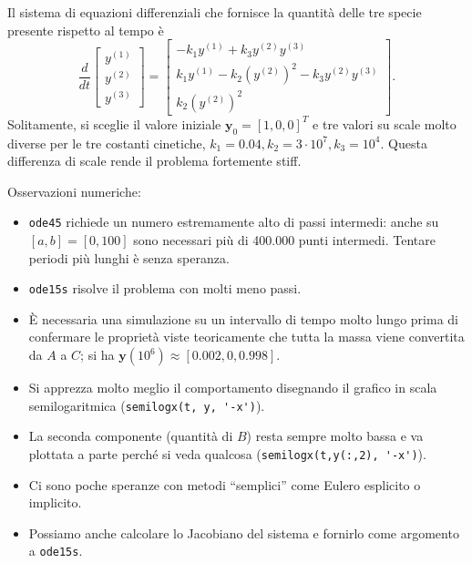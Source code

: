 \documentclass[a4paper]{report}
\theoremstyle{definiton}
\theoremstyle{remark}
\newcommand{\y}{\mathbf{y}}
\begin{document}
Il sistema di equazioni differenziali che fornisce la quantità delle tre specie presente rispetto al tempo è
\[
\frac{d}{dt}
\begin{bmatrix}
    y^{(1)}\\
    y^{(2)}\\
    y^{(3)}
\end{bmatrix}
=
\begin{bmatrix}
    -k_1y^{(1)} + k_3 y^{(2)} y^{(3)}\\
    k_1 y^{(1)} - k_2 (y^{(2)})^2 - k_3 y^{(2)} y^{(3)}\\
    k_2 (y^{(2)})^2
\end{bmatrix}.
\]
Solitamente, si sceglie il valore iniziale $\y_0 = [1,0,0]^T$ e tre valori su scale molto diverse per le tre costanti cinetiche, $k_1=0.04, k_2=3\cdot 10^7, k_3 = 10^4$. Questa differenza di scale rende il problema fortemente stiff.

Osservazioni numeriche:

\begin{itemize}
    \item \lstinline{ode45} richiede un numero estremamente alto di passi intermedi: anche su $[a,b]=[0,100]$ sono necessari più di 400.000 punti intermedi. Tentare periodi più lunghi è senza speranza.
    \item \lstinline{ode15s} risolve il problema con molti meno passi.
    \item È necessaria una simulazione su un intervallo di tempo molto lungo prima di confermare le proprietà viste teoricamente che tutta la massa viene convertita da $A$ a $C$; si ha $\y(10^6) \approx [0.002, 0, 0.998]$.
    \item Si apprezza molto meglio il comportamento disegnando il grafico in scala semilogaritmica (\lstinline{semilogx(t, y, '-x')}).
    \item La seconda componente (quantità di $B$) resta sempre molto bassa e va plottata a parte perché si veda qualcosa (\lstinline{semilogx(t,y(:,2), '-x')}).
    \item Ci sono poche speranze con metodi ``semplici'' come Eulero esplicito o implicito.
    \item Possiamo anche calcolare lo Jacobiano del sistema e fornirlo come argomento a \lstinline{ode15s}.
\end{itemize}
\end{document}
